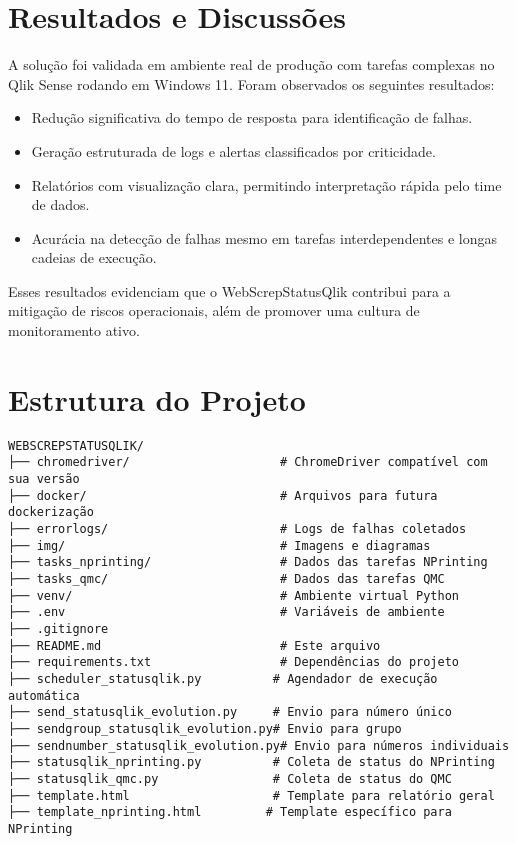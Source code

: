 \documentclass[conference]{IEEEtran}
\begin{document}
\section{Resultados e Discussões}
A solução foi validada em ambiente real de produção com tarefas complexas no Qlik Sense rodando em Windows 11. Foram observados os seguintes resultados:
\begin{itemize}
  \item Redução significativa do tempo de resposta para identificação de falhas.
  \item Geração estruturada de logs e alertas classificados por criticidade.
  \item Relatórios com visualização clara, permitindo interpretação rápida pelo time de dados.
  \item Acurácia na detecção de falhas mesmo em tarefas interdependentes e longas cadeias de execução.
\end{itemize}
Esses resultados evidenciam que o WebScrepStatusQlik contribui para a mitigação de riscos operacionais, além de promover uma cultura de monitoramento ativo.

\section*{Estrutura do Projeto}
\begin{lstlisting}
WEBSCREPSTATUSQLIK/
├── chromedriver/                     # ChromeDriver compatível com sua versão
├── docker/                           # Arquivos para futura dockerização
├── errorlogs/                        # Logs de falhas coletados
├── img/                              # Imagens e diagramas
├── tasks_nprinting/                  # Dados das tarefas NPrinting
├── tasks_qmc/                        # Dados das tarefas QMC
├── venv/                             # Ambiente virtual Python
├── .env                              # Variáveis de ambiente
├── .gitignore
├── README.md                         # Este arquivo
├── requirements.txt                  # Dependências do projeto
├── scheduler_statusqlik.py          # Agendador de execução automática
├── send_statusqlik_evolution.py     # Envio para número único
├── sendgroup_statusqlik_evolution.py# Envio para grupo
├── sendnumber_statusqlik_evolution.py# Envio para números individuais
├── statusqlik_nprinting.py          # Coleta de status do NPrinting
├── statusqlik_qmc.py                # Coleta de status do QMC
├── template.html                    # Template para relatório geral
├── template_nprinting.html         # Template específico para NPrinting
\end{lstlisting}
\end{document}
